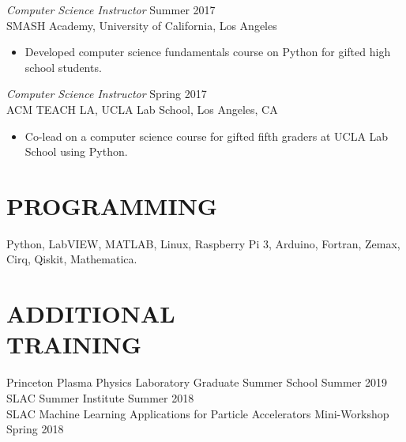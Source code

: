 \documentclass[margin,line]{res}
\let\origsection\section%
\let\section\subsection%
\let\section\origsection%
\begin{document}
\begin{resume}
 {\sl Computer Science Instructor} \hfill            Summer 2017 \\
SMASH Academy, University of California, Los Angeles
\begin{itemize}  \itemsep -2pt %
	\item Developed computer science fundamentals course on Python for gifted high school students.
\end{itemize} 

{\sl Computer Science Instructor} \hfill        Spring 2017  \\
ACM TEACH LA, UCLA Lab School,   Los Angeles, CA
\begin{itemize} \itemsep -2pt 
	\item Co-lead on a computer science course for gifted fifth graders at UCLA Lab School using Python.
\end{itemize} 


\iffalse
{\sl CSL Fellow} \hfill        Fall 2016  \\
Hispanic Heritage Foundation,   San Fernando, CA
\begin{itemize} \itemsep -2pt 
	\item Provided programming fundamentals workshop for AP Computer Science students using Java at San Fernando High School Magnet program.
\end{itemize}
\fi

\section{\mysidestyle  PROGRAMMING}  Python, LabVIEW, MATLAB, Linux, Raspberry Pi 3, Arduino, Fortran, Zemax, Cirq, Qiskit, Mathematica.

           
\section{\mysidestyle  ADDITIONAL \\ TRAINING}
 
{ Princeton Plasma Physics Laboratory
Graduate Summer School }\hfill  Summer 2019\\
{SLAC Summer Institute }\hfill  Summer 2018 \\
 { 
SLAC Machine Learning Applications for Particle Accelerators Mini-Workshop} \hfill            Spring 2018 \\        


\end{resume}
\end{document}
